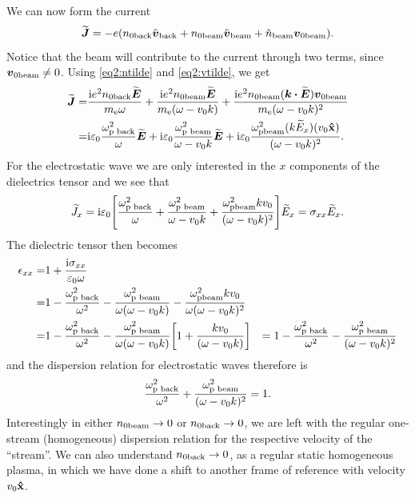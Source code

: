 \documentclass[11pt,a4paper, 
swedish, english %
]{article}
\newcommand{\enull}{\ensuremath{\varepsilon_{0}}}
\newcommand{\mee}{\ensuremath{m_{\text{e}}}}
\begin{document}
We can now form the current 
\begin{equation}
\widetilde{\vb*J}=-e\qty(n_{0\text{back}}\tilde{\vb*v}_{\text{back}}
+n_{0\text{beam}}\tilde{\vb*v}_{\text{beam}}
+\tilde{n}_{\text{beam}}\vb*v_{0\text{beam}}).
\end{equation}
Notice that the beam will contribute to the current through two terms,
since $\vb*v_{0\text{beam}}\neq0$. Using \eqref{eq2:ntilde} and
\eqref{eq2:vtilde}, we get
\begin{equation}
\begin{aligned}
\widetilde{\vb*J}=&
\frac{\ii e^2\back{n}{0}\widetilde{\vb*E}}{\mee\omega}
+\frac{\ii e^2\beam{n}{0}\widetilde{\vb*E}}{\mee(\omega-v_0k)}
+\frac{\ii e^2\beam{n}{0}(\vb*k\vdot\widetilde{\vb*E})\beam{\vb*v}{0}}
{\mee(\omega-v_0k)^2}\\
=&\ii\enull\frac{\back{\omega}{\text{p }}^2}{\omega}
\widetilde{\vb*E}
+\ii\enull\frac{\beam{\omega}{\text{p }}^2}{\omega-v_0k}
\widetilde{\vb*E}
+\ii\enull\frac{\beam{\omega}{\text{p}}^2
(k\widetilde{E}_x)(v_0\vu{x})}{(\omega-v_0k)^2}.
\end{aligned}
\end{equation}
For the electrostatic wave we are only interested in the $x$
components of the dielectrics tensor and we see that
\begin{equation}
\widetilde{J}_x= \ii\enull\qty[
\frac{\back{\omega}{\text{p }}^2}{\omega}
+\frac{\beam{\omega}{\text{p }}^2}{\omega-v_0k}
+\frac{\beam{\omega}{\text{p}}^2kv_0}{(\omega-v_0k)^2}
]\widetilde{E}_x
=\sigma_{xx}\widetilde{E}_x.
\end{equation}
The dielectric tensor then becomes
\begin{equation}
\begin{aligned}
\epsilon_{xx}=&1+\frac{\ii\sigma_{xx}}{\enull\omega}\\
=&1-\frac{\back{\omega}{\text{p }}^2}{\omega^2}
-\frac{\beam{\omega}{\text{p }}^2}{\omega(\omega-v_0k)}
-\frac{\beam{\omega}{\text{p}}^2kv_0}{\omega(\omega-v_0k)^2}\\
=&1-\frac{\back{\omega}{\text{p }}^2}{\omega^2}
-\frac{\beam{\omega}{\text{p }}^2}{\omega(\omega-v_0k)}
\qty[1+\frac{kv_0}{(\omega-v_0k)}]
&=1-\frac{\back{\omega}{\text{p }}^2}{\omega^2}
-\frac{\beam{\omega}{\text{p }}^2}{(\omega-v_0k)^2}
\end{aligned}
\end{equation}
and the dispersion relation for electrostatic waves therefore is
\begin{equation}\label{eq2:disp}
\frac{\omega_{\text{p }\text{back}}^2}{\omega^2}
+\frac{\omega_{\text{p }\text{beam}}^2}{(\omega-v_0k)^2}
=1.
\end{equation}
Interestingly in either $n_{0\text{beam}}\to0$ or $n_{0\text{back}}\to0$, we are
left with the regular one-stream (homogeneous) dispersion relation for
the respective velocity of the ``stream''. We can also understand
$n_{0\text{back}}\to0$, as a regular static homogeneous plasma, in which we
have done a shift to another frame of reference with velocity
$v_0\vu{x}$. 
\end{document}
